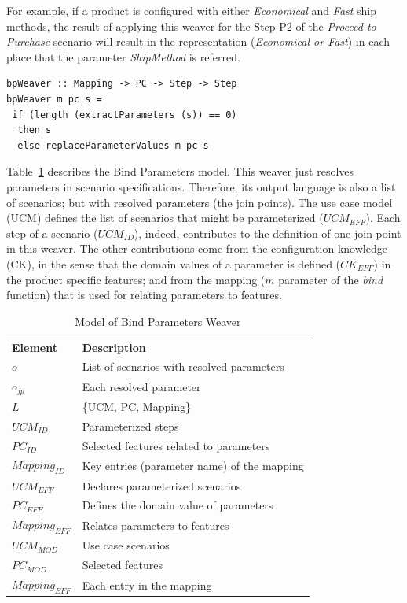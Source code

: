 \documentclass{acm_proc_article-sp}
\begin{document}
{For example, if a product is configured with either \emph{Economical} and 
\emph{Fast} ship methods, the result of applying this weaver for 
the Step P2 of the \emph{Proceed to Purchase} scenario will result in the 
representation (\emph{Economical or Fast}) in each place that the parameter \emph{ShipMethod} is referred.


\begin{lstlisting}[belowskip=10pt,frame=tb,caption={Bind parameter weaver function},label=lst:bind]
bpWeaver :: Mapping -> PC -> Step -> Step
bpWeaver m pc s =
 if (length (extractParameters (s)) == 0)
  then s
  else replaceParameterValues m pc s
\end{lstlisting}

Table~\ref{tab:bp-weaver} describes the Bind Parameters model. This weaver just resolves parameters in scenario specifications. Therefore, its output language is also a list of scenarios; but with resolved parameters (the join points). 
The use case model (UCM) defines the list of scenarios that might be parameterized ($UCM_{EFF}$). Each step of a scenario ($UCM_{ID}$), indeed, contributes to the definition of one join point in this weaver. The 
other contributions come from the configuration knowledge (CK), in the sense that the domain values 
of a parameter is defined ($CK_{EFF}$) in the product specific features; and from the mapping ($m$ parameter of the \emph{bind} function) that is used for relating parameters to features. 

\begin{table}[h]
\begin{center}
\caption{Model of Bind Parameters Weaver} \label{tab:bp-weaver}
\begin{tabular}{p{0.7in}p{2.3in}}
   \hline\noalign{\smallskip}
  {\bf Element} & {\bf Description} \\
   \noalign{\smallskip}
   \hline
   \noalign{\smallskip}
   $o$               & List of scenarios with resolved parameters  \\ 
   $o_{jp}$        & Each resolved parameter \\ 
   $L$               & \{UCM, PC, Mapping\} \\ 
   $UCM_{ID}$ & Parameterized steps \\
   $PC_{ID}$    & Selected features related to parameters \\ 
   $Mapping_{ID}$ & Key entries (parameter name) of the mapping\\
   $UCM_{EFF}$ & Declares parameterized scenarios \\
   $PC_{EFF}$    & Defines the domain value of parameters \\ 
   $Mapping_{EFF}$ & Relates parameters to features \\
   $UCM_{MOD}$ & Use case scenarios \\
   $PC_{MOD}$    & Selected features \\ 
   $Mapping_{EFF}$ & Each entry in the mapping \\
  \hline
  \end{tabular}
\end{center}
\end{table}

}
\end{document}
